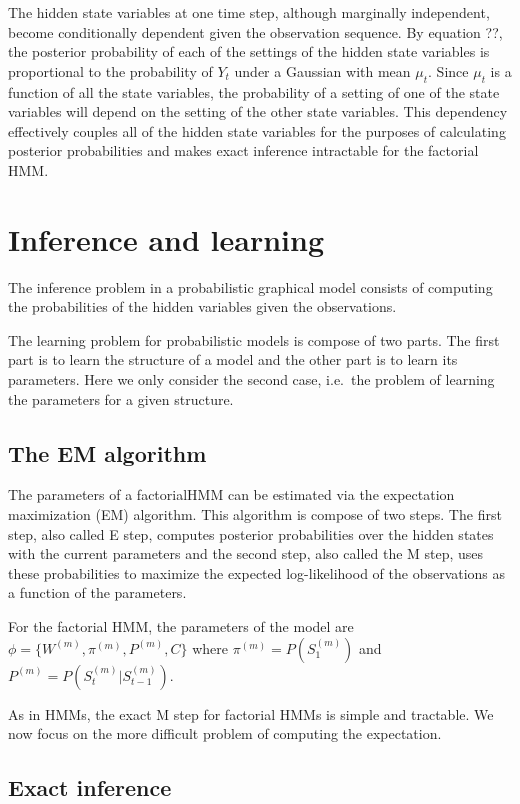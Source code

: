 \documentclass{article}
\begin{document}
The hidden state variables at one time step, although marginally independent, become conditionally dependent given the observation sequence. By equation ??, the posterior probability of each of the settings of the hidden state variables is proportional to the probability of $Y_t$ under a Gaussian with mean $\mu_t$. Since $\mu_t$ is a function of all the state variables, the probability of a setting of one of the state variables will depend on the setting of the other state variables. This dependency effectively couples all of the hidden state variables for the purposes of calculating posterior probabilities and makes exact inference intractable for the factorial HMM.

\section{Inference and learning}

The inference problem in a probabilistic graphical model consists of computing the probabilities of the hidden variables given the observations.

The learning problem for probabilistic models is compose of two parts. The first part is to learn the structure of a model and the other part is to learn its parameters. Here we only consider the second case, i.e.\ the problem of learning the parameters for a given structure. 

\subsection{The EM algorithm}

The parameters of a factorialHMM can be estimated via the expectation maximization (EM) algorithm. This algorithm is compose of two steps. The first step, also called E step, computes posterior probabilities over the hidden states with the current parameters and the second step, also called the M step, uses these probabilities to maximize the expected log-likelihood of the observations as a function of the parameters.

For the factorial HMM, the parameters of the model are $\phi = \{ W^{(m)}, \pi^{(m)}, P^{(m)}, C \}$ where $\pi^{(m)} = P(S_1^{(m)})$ and $P^{(m)} = P(S_t^{(m)} | S_{t-1}^{(m)})$. 

As in HMMs, the exact M step for factorial HMMs is simple and tractable. We now focus on the more difficult problem of computing the expectation.

\subsection{Exact inference}
\end{document}
